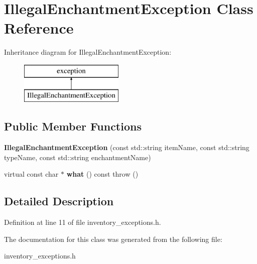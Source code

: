 \hypertarget{class_illegal_enchantment_exception}{}\section{Illegal\+Enchantment\+Exception Class Reference}
\label{class_illegal_enchantment_exception}
Inheritance diagram for Illegal\+Enchantment\+Exception\+:\begin{figure}[H]
\begin{center}
\leavevmode
\includegraphics[height=2.000000cm]{class_illegal_enchantment_exception}
\end{center}
\end{figure}
\subsection*{Public Member Functions}
\begin{DoxyCompactItemize}
\item 
\hypertarget{class_illegal_enchantment_exception_a0a7c2474b42ba67341d836f98e287480}{}\label{class_illegal_enchantment_exception_a0a7c2474b42ba67341d836f98e287480} 
{\bfseries Illegal\+Enchantment\+Exception} (const std\+::string item\+Name, const std\+::string type\+Name, const std\+::string enchantment\+Name)
\item 
\hypertarget{class_illegal_enchantment_exception_a4a23145dda73d4563832d90bcfe7c684}{}\label{class_illegal_enchantment_exception_a4a23145dda73d4563832d90bcfe7c684} 
virtual const char $\ast$ {\bfseries what} () const  throw ()
\end{DoxyCompactItemize}


\subsection{Detailed Description}


Definition at line 11 of file inventory\+\_\+exceptions.\+h.



The documentation for this class was generated from the following file\+:\begin{DoxyCompactItemize}
\item 
inventory\+\_\+exceptions.\+h\end{DoxyCompactItemize}
